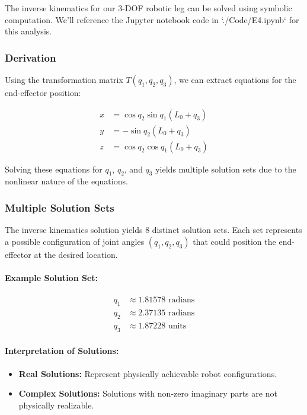 \begin{solution}
The inverse kinematics for our 3-DOF robotic leg can be solved using symbolic computation. We'll reference the Jupyter notebook code in `./Code/E4.ipynb` for this analysis.

\subsubsection*{Derivation}

Using the transformation matrix $T(q_1, q_2, q_3)$, we can extract equations for the end-effector position:

\begin{align*}
x &= \cos q_2 \sin q_1 (L_0 + q_3) \\
y &= -\sin q_2 (L_0 + q_3) \\
z &= \cos q_2 \cos q_1 (L_0 + q_3)
\end{align*}

Solving these equations for $q_1$, $q_2$, and $q_3$ yields multiple solution sets due to the nonlinear nature of the equations.

\subsubsection*{Multiple Solution Sets}

The inverse kinematics solution yields 8 distinct solution sets. Each set represents a possible configuration of joint angles $(q_1, q_2, q_3)$ that could position the end-effector at the desired location.

\paragraph{Example Solution Set:}
\begin{align*}
    q_1 &\approx 1.81578 \text{ radians} \\
    q_2 &\approx 2.37135 \text{ radians} \\
    q_3 &\approx 1.87228 \text{ units}
\end{align*}

\paragraph{Interpretation of Solutions:}
\begin{itemize}
    \item \textbf{Real Solutions:} Represent physically achievable robot configurations.
    \item \textbf{Complex Solutions:} Solutions with non-zero imaginary parts are not physically realizable.
\end{itemize}


\end{solution}
